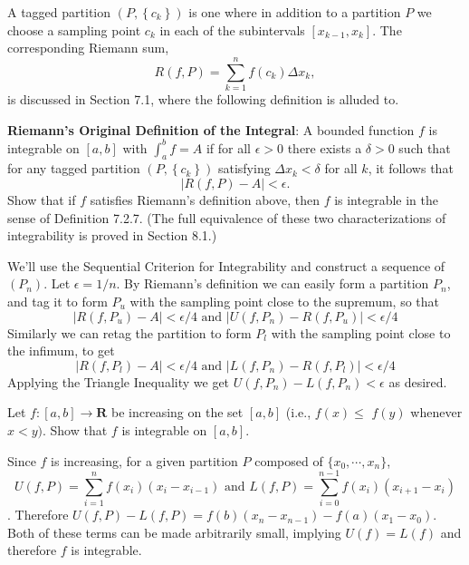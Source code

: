\begin{exercise}
A tagged partition $\left(P,\left\{c_{k}\right\}\right)$ is one where in addition to a partition $P$ we choose a sampling point $c_{k}$ in each of the subintervals $\left[x_{k-1}, x_{k}\right]$. The corresponding Riemann sum,
$$
R(f, P)=\sum_{k=1}^{n} f\left(c_{k}\right) \Delta x_{k},
$$
is discussed in Section 7.1, where the following definition is alluded to.

{\bf Riemann's Original Definition of the Integral}: A bounded function $f$ is integrable on $[a, b]$ with $\int_{a}^{b} f=A$ if for all $\epsilon>0$ there exists a $\delta>0$ such that for any tagged partition $\left(P,\left\{c_{k}\right\}\right)$ satisfying $\Delta x_{k}<\delta$ for all $k$, it follows that
$$
|R(f, P)-A|<\epsilon .
$$
Show that if $f$ satisfies Riemann's definition above, then $f$ is integrable in the sense of Definition 7.2.7. (The full equivalence of these two characterizations of integrability is proved in Section 8.1.)
\end{exercise}
\begin{solution}
We'll use the Sequential Criterion for Integrability and construct a sequence of \((P_n)\). Let \(\epsilon = 1/n\). By Riemann's definition we can easily form a partition \(P_n\), and tag it to form \(P_u\) with the sampling point close to the supremum, so that
\[|R(f,P_u) - A| < \epsilon/4 \text{ and } |U(f,P_n) - R(f,P_u)| < \epsilon/4\]
 Similarly we can retag the partition to form \(P_l\) with the sampling point close to the infimum, to get
\[|R(f, P_l) - A| < \epsilon/4\text{ and }|L(f,P_n) - R(f, P_l)|<\epsilon/4\]
Applying the Triangle Inequality we get \(U(f,P_n) - L(f,P_n) < \epsilon\) as desired.
\end{solution}

\begin{exercise}
Let $f:[a, b] \rightarrow \mathbf{R}$ be increasing on the set $[a, b]$ (i.e., $f(x) \leq$ $f(y)$ whenever $x<y)$. Show that $f$ is integrable on $[a, b]$.
\end{exercise}
\begin{solution}
Since \(f\) is increasing, for a given partition \(P\) composed of \(\{x_0, \cdots, x_n\}\),
\[U(f,P) = \sum^n_{i=1} f(x_i) (x_i - x_{i-1})\text{ and }L(f,P) = \sum^{n-1}_{i=0} f(x_i) (x_{i+1} - x_i)\]. Therefore \(U(f,P) - L(f,P) = f(b)(x_n - x_{n-1}) - f(a)(x_1 - x_0)\). Both of these terms can be made arbitrarily small, implying \(U(f) = L(f)\) and therefore \(f\) is integrable.
\end{solution}
